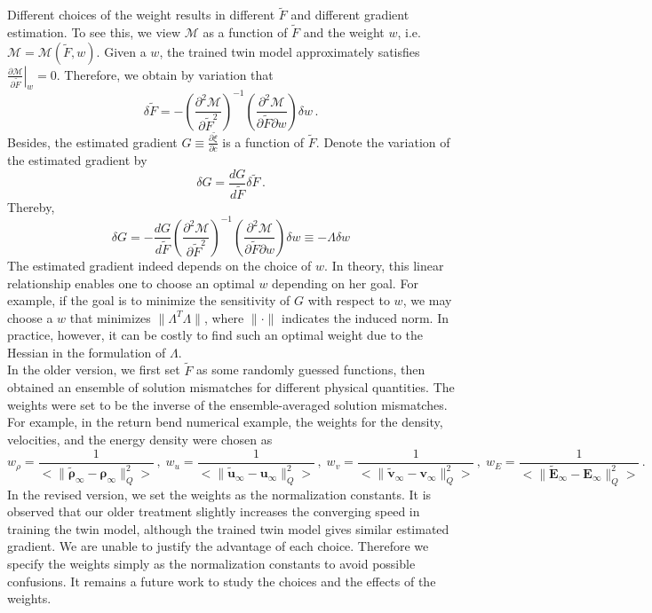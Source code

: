 \documentclass[a4paper,twoside]{article}
\begin{document}
Different choices of the weight results in different $\tilde{F}$ and different gradient estimation.
To see this, we view $\mathcal{M}$ as a function of $\tilde{F}$ and the weight $w$, i.e.
$\mathcal{M} = \mathcal{M}(\tilde{F}, w)$. Given a $w$, the trained twin model approximately satisfies
$\left.\frac{\partial \mathcal{M}}{\partial \tilde{F}}\right|_w = 0$. Therefore,
we obtain by variation that
$$
    \delta \tilde{F} = - \left(\frac{\partial^2 \mathcal{M}}{\partial \tilde{F}^2}\right)^{-1}
    \left(\frac{\partial^2 \mathcal{M}}{\partial \tilde{F}\partial w}\right) \delta w\,.
$$
Besides, the estimated gradient $G\equiv \frac{\partial \tilde{\xi}}{\partial c}$ 
is a function of $\tilde{F}$.
Denote the variation of the estimated gradient by
$$
    \delta G = \frac{dG}{d\tilde{F}} \delta \tilde{F}\,.
$$
Thereby,
\begin{equation*}
    \delta G = - \frac{dG}{d\tilde{F}} \left( \frac{\partial^2 \mathcal{M}}{\partial \tilde{F}^2} \right)^{-1} \left( \frac{\partial^2 \mathcal{M}}{\partial \tilde{F} \partial w} \right) \delta w 
    \equiv - \Lambda \delta w
\end{equation*}
The estimated gradient indeed depends on the choice of $w$.
In theory, this linear relationship enables one to choose an optimal $w$ depending on her goal. 
For example, if the goal is to minimize the sensitivity of $G$ with respect to $w$, 
we may choose a $w$ that minimizes $\|\Lambda^T \Lambda\|$, where $\|\cdot\|$ indicates the
induced norm. In practice, however, it can be costly to find such an optimal weight due to 
the Hessian in the formulation of $\Lambda$.\\

In the older version,
we first set $\tilde{F}$ as some randomly guessed functions, then obtained an ensemble of solution
mismatches for different physical quantities. The weights were set to be the 
inverse of the ensemble-averaged solution mismatches.
For example, in the return bend numerical example, the weights for the density, velocities, and
the energy density were chosen as
\begin{equation*}
    w_\rho = \frac{1}{\Big< \|\tilde{\boldsymbol{\rho}}_\infty - \boldsymbol{\rho}_\infty\|_Q^2 \Big>}\,,
    \; 
    w_u = \frac{1}{\Big< \|\tilde{\boldsymbol{u}}_\infty - \boldsymbol{u}_\infty\|_Q^2 \Big>}\,,
    \;
    w_v = \frac{1}{\Big< \|\tilde{\boldsymbol{v}}_\infty - \boldsymbol{v}_\infty\|_Q^2 \Big>}\,,
    \;
    w_E = \frac{1}{\Big< \|\tilde{\boldsymbol{E}}_\infty - \boldsymbol{E}_\infty\|_Q^2 \Big>}\,.
\end{equation*}
In the revised version, we set the weights as the normalization constants.
It is observed that our older treatment slightly increases the converging 
speed in training the twin model,
although the trained twin model gives similar estimated gradient. We are unable to justify the
advantage of each choice. Therefore we specify the weights simply as the normalization constants
to avoid possible confusions. It remains a future work to study the choices and the effects
of the weights.\\
\end{document}
